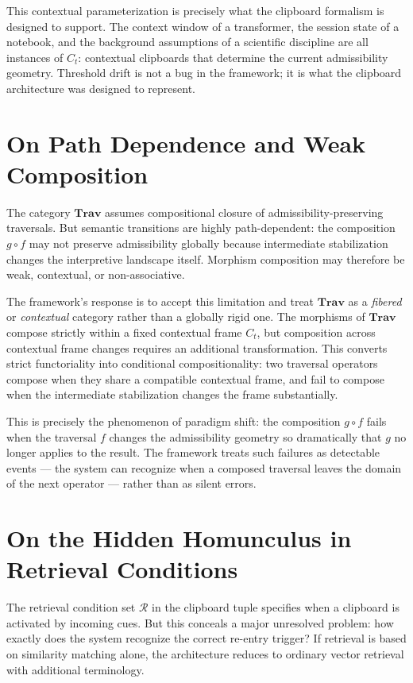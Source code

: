 \documentclass[12pt,oneside]{book}
\theoremstyle{plain}
\theoremstyle{definition}
\theoremstyle{plain}
\newcommand{\Trav}{\mathbf{Trav}}
\newcommand{\cR}{\mathcal{R}}
\begin{document}
This contextual parameterization is precisely what the clipboard formalism is designed to support. The context window of a transformer, the session state of a notebook, and the background assumptions of a scientific discipline are all instances of $C_t$: contextual clipboards that determine the current admissibility geometry. Threshold drift is not a bug in the framework; it is what the clipboard architecture was designed to represent.

\section{On Path Dependence and Weak Composition}

The category $\Trav$ assumes compositional closure of admissibility-preserving traversals. But semantic transitions are highly path-dependent: the composition $g \circ f$ may not preserve admissibility globally because intermediate stabilization changes the interpretive landscape itself. Morphism composition may therefore be weak, contextual, or non-associative.

The framework's response is to accept this limitation and treat $\Trav$ as a \emph{fibered} or \emph{contextual} category rather than a globally rigid one. The morphisms of $\Trav$ compose strictly within a fixed contextual frame $C_t$, but composition across contextual frame changes requires an additional transformation. This converts strict functoriality into conditional compositionality: two traversal operators compose when they share a compatible contextual frame, and fail to compose when the intermediate stabilization changes the frame substantially.

This is precisely the phenomenon of paradigm shift: the composition $g \circ f$ fails when the traversal $f$ changes the admissibility geometry so dramatically that $g$ no longer applies to the result. The framework treats such failures as detectable events — the system can recognize when a composed traversal leaves the domain of the next operator — rather than as silent errors.

\section{On the Hidden Homunculus in Retrieval Conditions}

The retrieval condition set $\cR$ in the clipboard tuple specifies when a clipboard is activated by incoming cues. But this conceals a major unresolved problem: how exactly does the system recognize the correct re-entry trigger? If retrieval is based on similarity matching alone, the architecture reduces to ordinary vector retrieval with additional terminology.
\end{document}
